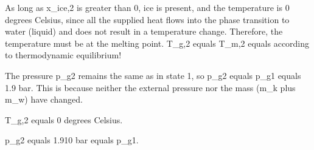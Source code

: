 As long as x_ice,2 is greater than 0, ice is present, and the temperature is 0 degrees Celsius, since all the supplied heat flows into the phase transition to water (liquid) and does not result in a temperature change. Therefore, the temperature must be at the melting point. T_g,2 equals T_m,2 equals according to thermodynamic equilibrium!

The pressure p_g2 remains the same as in state 1, so p_g2 equals p_g1 equals 1.9 bar. This is because neither the external pressure nor the mass (m_k plus m_w) have changed.

T_g,2 equals 0 degrees Celsius.

p_g2 equals 1.910 bar equals p_g1.